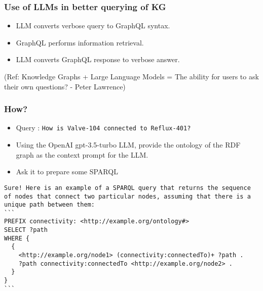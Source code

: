 \begin{frame}[fragile]\frametitle{Use of LLMs in better querying of KG}

\begin{itemize}
\item LLM converts verbose query to GraphQL syntax.
\item GraphQL performs information retrieval.
\item LLM converts GraphQL response to verbose answer.
\end{itemize}

	
{\tiny (Ref: Knowledge Graphs + Large Language Models = The ability for users to ask their own questions? - Peter Lawrence)}

\end{frame}

\begin{frame}[fragile]\frametitle{How?}

\begin{itemize}
\item Query : \lstinline|How is Valve-104 connected to Reflux-401?|
\item Using the OpenAI gpt-3.5-turbo LLM, provide the ontology of the RDF graph as the context prompt for the LLM.
\item Ask it to prepare some SPARQL
\end{itemize}	

\begin{lstlisting}
Sure! Here is an example of a SPARQL query that returns the sequence of nodes that connect two particular nodes, assuming that there is a unique path between them:
```
PREFIX connectivity: <http://example.org/ontology#>
SELECT ?path
WHERE {
  {
    <http://example.org/node1> (connectivity:connectedTo)+ ?path .
    ?path connectivity:connectedTo <http://example.org/node2> .
  }
}
```
\end{lstlisting}

\end{frame}



